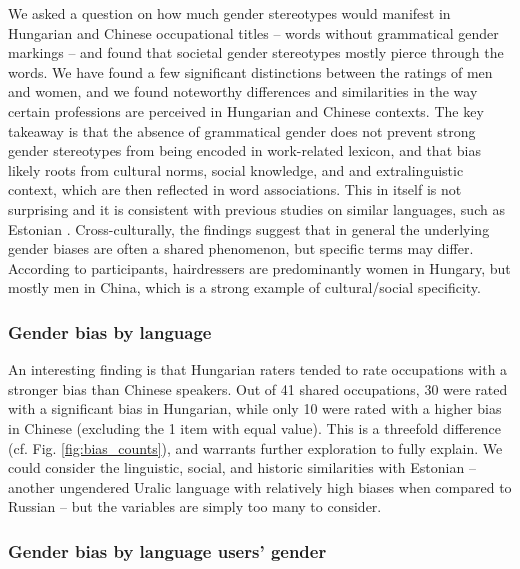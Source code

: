 \documentclass[11pt]{article}
\begin{document}
We asked a question on how much gender stereotypes would manifest in Hungarian and Chinese occupational titles -- words without grammatical gender markings -- and found that societal gender stereotypes mostly pierce through the words. We have found a few significant distinctions between the ratings of men and women, and we found noteworthy differences and similarities in the way certain professions are perceived in Hungarian and Chinese contexts. The key takeaway is that the absence of grammatical gender does not prevent strong gender stereotypes from being encoded in work-related lexicon, and that bias likely roots from cultural norms, social knowledge, and and extralinguistic context, which are then reflected in word associations. This in itself is not surprising and it is consistent with previous studies on similar languages, such as Estonian \citet{kaukonen_2025_gender}. Cross-culturally, the findings suggest that in general the underlying gender biases are often a shared phenomenon, but specific terms may differ. According to participants, hairdressers are predominantly women in Hungary, but mostly men in China, which is a strong example of cultural/social specificity.

\subsubsection{Gender bias by language}

An interesting finding is that Hungarian raters tended to rate occupations with a stronger bias than Chinese speakers. Out of 41 shared occupations, 30 were rated with a significant bias in Hungarian, while only 10 were rated with a higher bias in Chinese (excluding the 1 item with equal value). This is a threefold difference (cf. Fig. \ref{fig:bias_counts}), and warrants further exploration to fully explain. We could consider the linguistic, social, and historic similarities with Estonian -- another ungendered Uralic language with relatively high biases when compared to Russian \citep{kaukonen_2025_gender} -- but the variables are simply too many to consider. 


\subsubsection{Gender bias by language users' gender}
\end{document}
